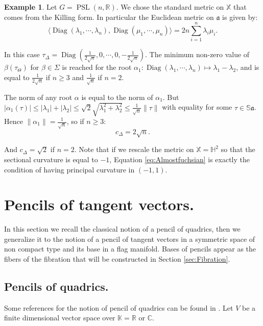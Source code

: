 \documentclass[reqno,10pt]{amsart}
\theoremstyle{plain}
\theoremstyle{definition}
\newtheorem{exmp}[thm]{Example}
\theoremstyle{remark}
\newcommand{\type}{\tau}
\newcommand{\R}{\mathbb{R}}
\newcommand{\C}{\mathbb{C}}
\newcommand{\Sph}{\mathbb{S}}
\newcommand{\K}{\mathbb{K}}
\DeclareMathOperator{\PSL}{PSL}
\DeclareMathOperator{\Diag}{Diag}
\newcommand{\X}{\mathbb{X}}
\begin{document}
\begin{exmp}
Let $G=\PSL(n,\R)$. We chose the standard metric on $\X$ that comes from the Killing form. In particular the Euclidean metric on $\mathfrak{a}$ is given by:
$$\langle\Diag(\lambda_1,\cdots,\lambda_n),\Diag(\mu_1,\cdots,\mu_n)\rangle=2n\sum_{i=1}^n \lambda_i\mu_i.$$

In this case $\type_\Delta=\Diag(\frac{1}{2\sqrt{n}},0,\cdots,0,-\frac{1}{2\sqrt{n}})$. 
The minimum non-zero value of $\beta(\type_\Theta)$ for $\beta\in \Sigma$ is reached for the root $\alpha_1:\Diag(\lambda_1,\cdots,\lambda_n)\mapsto \lambda_1-\lambda_2$, and is equal to $\frac{1}{2\sqrt{n}}$ if $n\geq 3$ and $\frac{1}{\sqrt{n}}$ if $n=2$.

\medskip

The norm of any root $\alpha$ is equal to the norm of $\alpha_1$. But $|\alpha_1(\type)|\leq |\lambda_1|+|\lambda_2|\leq {\sqrt{2}}\sqrt{\lambda_1^2+\lambda_2^2}\leq \frac{1}{\sqrt{n}}\lVert \type\rVert$ with equality for some $\type\in \Sph \mathfrak{a}$. Hence $\lVert\alpha_1\rVert=\frac{1}{\sqrt{n}}$, so if $n\geq 3$:
$$c_\Delta=2\sqrt{n}.$$ 

And $c_\Delta=\sqrt{2}$ if $n=2$. Note that if we rescale the metric on $\X=\mathbb{H}^2$ so that the sectional curvature is equal to $-1$, Equation \eqref{eq:Almostfuchsian} is exactly the condition of having principal curvature in $(-1,1)$.
\end{exmp}

\section{Pencils of tangent vectors.}
\label{sec:Pencils}
In this section we recall the classical notion of a pencil of quadrics, then we generalize it to the notion of a pencil of tangent vectors in a symmetric space of non compact type and its base in a flag manifold. Bases of pencils appear as the fibers of the fibration that will be constructed in Section \ref{sec:Fibration}.

\subsection{Pencils of quadrics.}

Some references for the notion of pencil of quadrics can be found in \cite{fevola2020pencils}. Let $V$ be a finite dimensional vector space over $\K=\R$ or $\C$.
\end{document}
